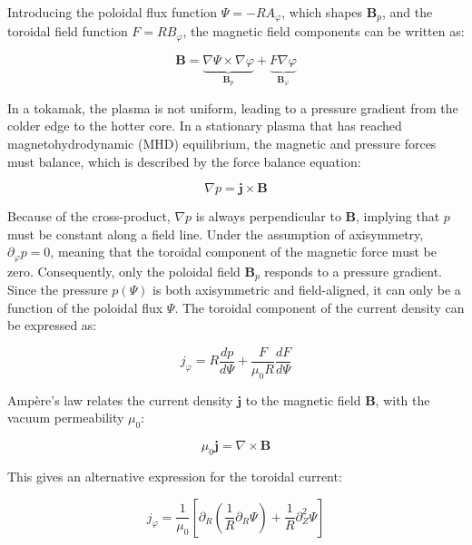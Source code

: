 Introducing the poloidal flux function \(\Psi = -RA_\varphi\), which shapes \(\mathbf{B}_p\), and the toroidal field function \(F = RB_\varphi\), the magnetic field components can be written as:

\begin{equation}
	\label{eq:intro_BeqMagneticFluxes}
	\mathbf{B} = \underbrace{\nabla \Psi \times \nabla \varphi}_{\mathbf{B}_p} + \underbrace{F \nabla \varphi}_{\mathbf{B}_\varphi}
\end{equation}

In a tokamak, the plasma is not uniform, leading to a pressure gradient from the colder edge to the hotter core. In a stationary plasma that has reached magnetohydrodynamic (MHD) equilibrium, the magnetic and pressure forces must balance, which is described by the force balance equation:

\begin{equation}
	\nabla p = \mathbf{j} \times \mathbf{B}
\end{equation}

Because of the cross-product, $\nabla p$ is always perpendicular to $\mathbf{B}$, implying that $p$ must be constant along a field line. Under the assumption of axisymmetry, $\partial_\varphi p = 0$, meaning that the toroidal component of the magnetic force must be zero. Consequently, only the poloidal field $\mathbf{B}_p$ responds to a pressure gradient. Since the pressure $p(\Psi)$ is both axisymmetric and field-aligned, it can only be a function of the poloidal flux $\Psi$. The toroidal component of the current density can be expressed as:

\begin{equation}
	j_\varphi = R\frac{dp}{d\Psi} + \frac{F}{\mu_0 R}\frac{dF}{d\Psi}
\end{equation}

Ampère's law relates the current density $\mathbf{j}$ to the magnetic field $\mathbf{B}$, with the vacuum permeability $\mu_0$:

\begin{equation}
	\mu_0\mathbf{j} = \nabla \times \mathbf{B}
\end{equation}

This gives an alternative expression for the toroidal current:

\begin{equation}
	j_\varphi = \frac{1}{\mu_0}\left[\partial_R\left(\frac{1}{R}\partial_R\Psi\right) + \frac{1}{R}\partial_Z^2\Psi\right]
\end{equation}

